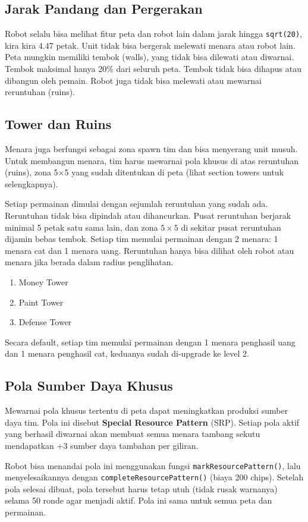 \subsection{Jarak Pandang dan Pergerakan}
Robot selalu bisa melihat fitur peta dan robot lain dalam jarak hingga \texttt{sqrt(20)}, kira kira 4.47 petak. Unit tidak bisa bergerak melewati menara atau robot lain. Peta mungkin memiliki tembok (walls), yang tidak bisa dilewati atau diwarnai. Tembok maksimal hanya 20\% dari seluruh peta. Tembok tidak bisa dihapus atau dibangun oleh pemain. Robot juga tidak bisa melewati atau mewarnai reruntuhan (ruins).

\subsection{Tower dan Ruins}
Menara juga berfungsi sebagai zona spawn tim dan bisa menyerang unit musuh. Untuk membangun menara, tim harus mewarnai pola khusus di atas reruntuhan (ruins), zona 5×5 yang sudah ditentukan di peta (lihat section towers untuk selengkapnya).

Setiap permainan dimulai dengan sejumlah reruntuhan yang sudah ada. Reruntuhan tidak bisa dipindah atau dihancurkan. Pusat reruntuhan berjarak minimal 5 petak satu sama lain, dan zona $5 \times 5$ di sekitar pusat reruntuhan dijamin bebas tembok. Setiap tim memulai permainan dengan 2 menara: 1 menara cat dan 1 menara uang. Reruntuhan hanya bisa dilihat oleh robot atau menara jika berada dalam radius penglihatan.
\begin{enumerate}
    \item Money Tower
    \item Paint Tower
    \item Defense Tower
\end{enumerate}
Secara default, setiap tim memulai permainan dengan 1 menara penghasil uang dan 1 menara penghasil cat, keduanya sudah di-upgrade ke level 2.

\subsection{Pola Sumber Daya Khusus}
Mewarnai pola khusus tertentu di peta dapat meningkatkan produksi sumber daya tim. Pola ini disebut \textbf{Special Resource Pattern} (SRP). Setiap pola aktif yang berhasil diwarnai akan membuat semua menara tambang sekutu mendapatkan +3 sumber daya tambahan per giliran.

Robot bisa menandai pola ini menggunakan fungsi \texttt{markResourcePattern()}, lalu menyelesaikannya dengan \texttt{completeResourcePattern()} (biaya 200 chips). Setelah pola selesai dibuat, pola tersebut harus tetap utuh (tidak rusak warnanya) selama 50 ronde agar menjadi aktif. Pola ini sama untuk semua peta dan permainan.

